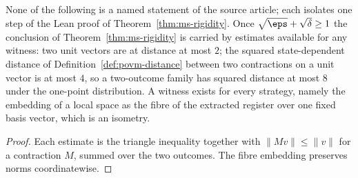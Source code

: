 \begin{lemma}\label{lem:ms-rigidity-support-constants}
	\leanok
	None of the following is a named statement of the source article; each isolates one step of the Lean proof of Theorem~\ref{thm:ms-rigidity}. Once $\sqrt\eps + \sqrt\delta \ge 1$ the conclusion of Theorem~\ref{thm:ms-rigidity} is carried by estimates available for any witness: two unit vectors are at distance at most $2$; the squared state-dependent distance of Definition~\ref{def:povm-distance} between two contractions on a unit vector is at most $4$, so a two-outcome family has squared distance at most $8$ under the one-point distribution. A witness exists for every strategy, namely the embedding of a local space as the fibre of the extracted register over one fixed basis vector, which is an isometry.
\end{lemma}
\begin{proof}
	\leanok
	Each estimate is the triangle inequality together with $\|Mv\| \le \|v\|$ for a contraction $M$, summed over the two outcomes. The fibre embedding preserves norms coordinatewise.
\end{proof}

